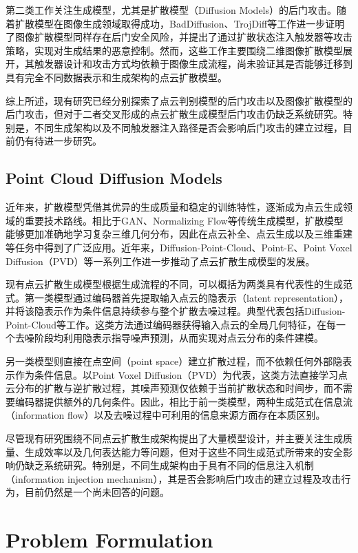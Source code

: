 \documentclass[UTF8,a4paper,11pt]{ctexart}
\begin{document}
第二类工作关注生成模型，尤其是扩散模型（Diffusion Models）的后门攻击。随着扩散模型在图像生成领域取得成功，BadDiffusion、TrojDiff等工作进一步证明了图像扩散模型同样存在后门安全风险，并提出了通过扩散状态注入触发器等攻击策略，实现对生成结果的恶意控制。然而，这些工作主要围绕二维图像扩散模型展开，其触发器设计和攻击方式均依赖于图像生成流程，尚未验证其是否能够迁移到具有完全不同数据表示和生成架构的点云扩散模型。

综上所述，现有研究已经分别探索了点云判别模型的后门攻击以及图像扩散模型的后门攻击，但对于二者交叉形成的点云扩散生成模型后门攻击仍缺乏系统研究。特别是，不同生成架构以及不同触发器注入路径是否会影响后门攻击的建立过程，目前仍有待进一步研究。
\subsection{Point Cloud Diffusion Models}
近年来，扩散模型凭借其优异的生成质量和稳定的训练特性，逐渐成为点云生成领域的重要技术路线。相比于GAN、Normalizing Flow等传统生成模型，扩散模型能够更加准确地学习复杂三维几何分布，因此在点云补全、点云生成以及三维重建等任务中得到了广泛应用。近年来，Diffusion-Point-Cloud、Point-E、Point Voxel Diffusion（PVD）等一系列工作进一步推动了点云扩散生成模型的发展。

现有点云扩散生成模型根据生成流程的不同，可以概括为两类具有代表性的生成范式。第一类模型通过编码器首先提取输入点云的隐表示（latent representation），并将该隐表示作为条件信息持续参与整个扩散去噪过程。典型代表包括Diffusion-Point-Cloud等工作。这类方法通过编码器获得输入点云的全局几何特征，在每一个去噪阶段均利用隐表示指导噪声预测，从而实现对点云分布的条件建模。

另一类模型则直接在点空间（point space）建立扩散过程，而不依赖任何外部隐表示作为条件信息。以Point Voxel Diffusion（PVD）为代表，这类方法直接学习点云分布的扩散与逆扩散过程，其噪声预测仅依赖于当前扩散状态和时间步，而不需要编码器提供额外的几何条件。因此，相比于前一类模型，两种生成范式在信息流（information flow）以及去噪过程中可利用的信息来源方面存在本质区别。

尽管现有研究围绕不同点云扩散生成架构提出了大量模型设计，并主要关注生成质量、生成效率以及几何表达能力等问题，但对于这些不同生成范式所带来的安全影响仍缺乏系统研究。特别是，不同生成架构由于具有不同的信息注入机制（information injection mechanism），其是否会影响后门攻击的建立过程及攻击行为，目前仍然是一个尚未回答的问题。
\section{Problem Formulation}
\end{document}

